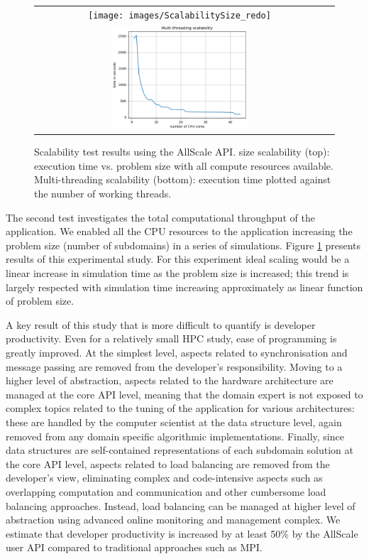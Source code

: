 \documentclass[conference,compsoc]{IEEEtran}
\begin{document}
\begin{figure}
\begin{tabular}{cc}
\texttt{[image: images/ScalabilitySize\_redo]} \\
\includegraphics[width=0.48\textwidth]{images/scalability-mt} 
\end{tabular}
\caption{Scalability test results using the AllScale API. size scalability (top): execution time vs. problem size with all compute resources available. Multi-threading scalability (bottom): execution time plotted against the number of working threads.}
\label{fig:scalability}
\end{figure}

The second test investigates the total computational throughput of the application. We enabled all the CPU resources to the application increasing the problem size (number of subdomains) in a series of simulations. Figure \ref{fig:scalability} presents results of this experimental study. For this experiment ideal scaling would be a linear increase in simulation time as the problem size is increased; this trend is largely respected with simulation time increasing approximately as linear function of problem size. 

A key result of this study that is more difficult to quantify is developer productivity. Even for a relatively small HPC study, ease of programming is greatly improved. At the simplest level, aspects related to synchronisation and message passing are removed from the developer's responsibility. Moving to a higher level of abstraction, aspects related to the hardware architecture are managed at the core API level, meaning that the domain expert is not exposed to complex topics related to the tuning of the application for various architectures: these are handled by the computer scientist at the data structure level, again removed from any domain specific algorithmic implementations. Finally, since data structures are self-contained representations of each subdomain solution at the core API level, aspects related to load balancing are removed from the developer's view, eliminating complex and code-intensive aspects such as overlapping computation and communication and other cumbersome load balancing approaches. Instead, load balancing can be managed at higher level of abstraction using advanced online monitoring and management complex. We estimate that developer productivity is increased by at least 50\% by the AllScale user API compared to traditional approaches such as MPI. 
\end{document}
